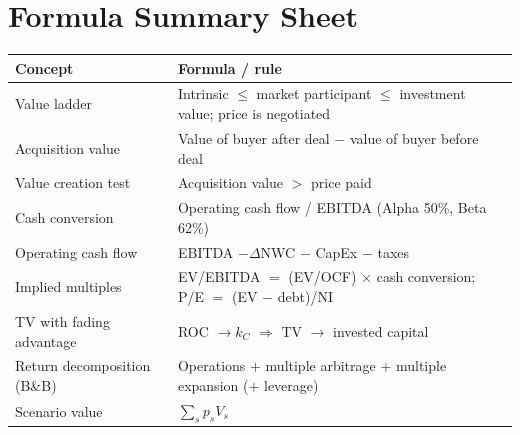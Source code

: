 \section{Formula Summary Sheet}
\begin{center}
\small
\renewcommand{\arraystretch}{1.5}
\begin{tabular}{@{}p{5cm}p{10cm}@{}}
\toprule
\textbf{Concept} & \textbf{Formula / rule}\\
\midrule
Value ladder & Intrinsic $\leq$ market participant $\leq$ investment value; price is negotiated\\
Acquisition value & Value of buyer after deal $-$ value of buyer before deal\\
Value creation test & Acquisition value $>$ price paid\\
Cash conversion & Operating cash flow / EBITDA (Alpha 50\%, Beta 62\%)\\
Operating cash flow & EBITDA $-\Delta$NWC $-$ CapEx $-$ taxes\\
Implied multiples & EV/EBITDA $=$ (EV/OCF) $\times$ cash conversion; P/E $=$ (EV $-$ debt)/NI\\
TV with fading advantage & ROC $\to k_C$ $\Rightarrow$ TV $\to$ invested capital\\
Return decomposition (B\&B) & Operations $+$ multiple arbitrage $+$ multiple expansion ($+$ leverage)\\
Scenario value & $\sum_s p_s V_s$\\
\bottomrule
\end{tabular}
\end{center}

